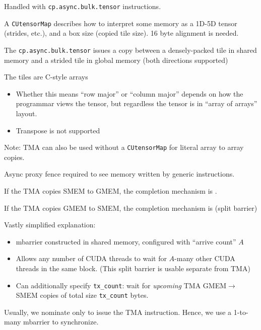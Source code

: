 \newpage
{}

\begin{minipage}[t]{0.5\textwidth}\fixminipage
Handled with \texttt{cp.async.bulk.tensor} instructions.

A \texttt{CUtensorMap} describes how to interpret some memory as a 1D-5D tensor (strides, etc.), and a box size (copied tile size).
16 byte alignment is needed.

The \texttt{cp.async.bulk.tensor} issues a copy between a densely-packed tile in shared memory and a strided tile in global memory
(both directions supported)

The tiles are C-style arrays
\begin{itemize}
  \item Whether this means ``row major'' or ``column major'' depends on how the programmar views the tensor, but regardless the tensor is in ``array of arrays'' layout.
  \item Transpose is not supported
\end{itemize}

Note: TMA can also be used without a \texttt{CUtensorMap} for literal array to array copies.
\end{minipage}
\hfill
\begin{minipage}[t]{0.5\textwidth}\fixminipage
{}

Async proxy fence required to see memory written by generic instructions.


If the TMA copies SMEM to GMEM, the completion mechanism is .

If the TMA copies GMEM to SMEM, the completion mechanism is  (split barrier)

Vastly simplified explanation:
\begin{itemize}
  \item mbarrier constructed in shared memory, configured with ``arrive count'' $A$
  \item Allows any number of CUDA threads to wait for $A$-many other CUDA threads in the same block.
    (This split barrier is usable separate from TMA)
  \item Can additionally specify \texttt{tx\_count}: wait for \textit{upcoming} TMA GMEM$\to$SMEM copies of total size \texttt{tx\_count} bytes.
\end{itemize}
Usually, we nominate only  to issue the TMA instruction.
Hence, we use a 1-to-many mbarrier to synchronize.

\end{minipage}
\newpage
{}

